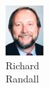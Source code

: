 \begin{figure}[H]
\begin{subfigure}[b]{0.1\textwidth}
                \includegraphics[width=\textwidth]{mugs/RandallRichard}
                \caption*{Richard \\ Randall}
        \end{subfigure}
                ~ %
        \begin{subfigure}[b]{0.1\textwidth}

\end{subfigure}
\end{figure}
